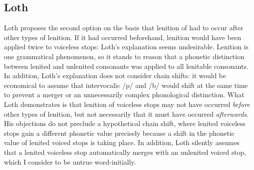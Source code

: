 \subsection{Loth}
Loth proposes the second option on the basis that lenition of  had to occur after other types of lenition. If it had occurred beforehand, lenition would have been applied twice to voiceless stops:  Loth's explanation seems undesirable. Lenition is one grammatical phenomenon, so it stands to reason that a phonetic distinction between lenited and unlenited consonants was applied to all lenitable consonants. In addition, Loth's explanation does not consider chain shifts: it would be economical to assume that intervocalic /p/ and /b/ would shift at the same time to prevent a merger or an unnecessarily complex phonological distinction. What Loth demonstrates is that lenition of voiceless stops may not have occurred \emph{before} other types of lenition, but not necessarily that it must have occurred \emph{afterwards}. His objections do not preclude a hypothetical chain shift, where lenited voiceless stops gain a different phonetic value precisely because a shift in the phonetic value of lenited voiced stops is taking place. In addition, Loth silently assumes that a lenited voiceless stop automatically merges with an unlenited voiced stop, which I consider to be untrue word-initially.

